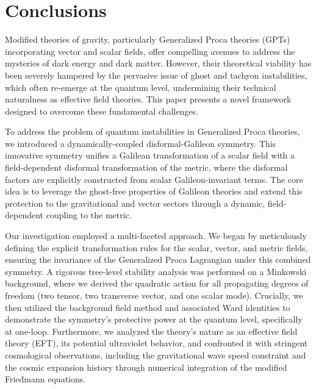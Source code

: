 \documentclass[twocolumn]{aastex631}
\begin{document}
\section{Conclusions}
\label{sec:conclusions}


Modified theories of gravity, particularly Generalized Proca theories (GPTs) incorporating vector and scalar fields, offer compelling avenues to address the mysteries of dark energy and dark matter. However, their theoretical viability has been severely hampered by the pervasive issue of ghost and tachyon instabilities, which often re-emerge at the quantum level, undermining their technical naturalness as effective field theories. This paper presents a novel framework designed to overcome these fundamental challenges.

To address the problem of quantum instabilities in Generalized Proca theories, we introduced a dynamically-coupled disformal-Galileon symmetry. This innovative symmetry unifies a Galilean transformation of a scalar field with a field-dependent disformal transformation of the metric, where the disformal factors are explicitly constructed from scalar Galileon-invariant terms. The core idea is to leverage the ghost-free properties of Galileon theories and extend this protection to the gravitational and vector sectors through a dynamic, field-dependent coupling to the metric.

Our investigation employed a multi-faceted approach. We began by meticulously defining the explicit transformation rules for the scalar, vector, and metric fields, ensuring the invariance of the Generalized Proca Lagrangian under this combined symmetry. A rigorous tree-level stability analysis was performed on a Minkowski background, where we derived the quadratic action for all propagating degrees of freedom (two tensor, two transverse vector, and one scalar mode). Crucially, we then utilized the background field method and associated Ward identities to demonstrate the symmetry's protective power at the quantum level, specifically at one-loop. Furthermore, we analyzed the theory's nature as an effective field theory (EFT), its potential ultraviolet behavior, and confronted it with stringent cosmological observations, including the gravitational wave speed constraint and the cosmic expansion history through numerical integration of the modified Friedmann equations.
\end{document}

